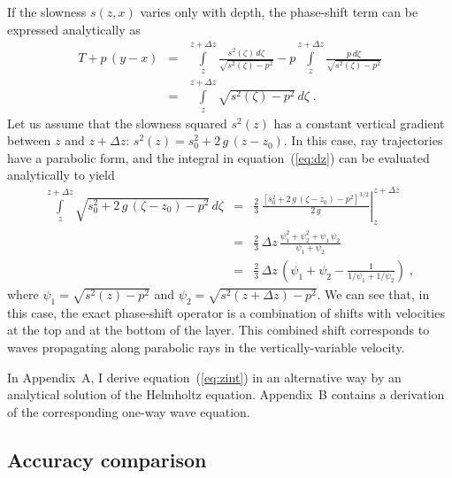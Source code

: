 If the slowness $s(z,x)$ varies only with depth, the phase-shift term can be
expressed analytically as
\begin{eqnarray}
\nonumber
  T + p\,(y-x) & = &
  \int\limits_{z}^{z+\Delta z} 
  \frac{s^2(\zeta)\,d \zeta}{\sqrt{s^2(\zeta)-p^2}}
  - p \int\limits_{z}^{z+\Delta z} \frac{p\,d \zeta}{\sqrt{s^2(\zeta)-p^2}} \\
  & = & \int\limits_{z}^{z+\Delta z} \sqrt{s^2(\zeta)-p^2}\,d \zeta\;.
  \label{eq:dz}
\end{eqnarray}
Let us assume that the slowness squared $s^2(z)$ has a constant vertical
gradient between $z$ and $z+\Delta z$: $s^2(z)=s_0^2+2\,g\,(z-z_0)$. In this
case, ray trajectories have a parabolic form, and the integral in
equation~(\ref{eq:dz}) can be evaluated analytically to yield
\begin{eqnarray}
\nonumber
  \int\limits_{z}^{z+\Delta z} \sqrt{s_0^2+2\,g\,(\zeta-z_0)-p^2}\,d \zeta 
  & = & \left.
  \frac{2}{3}\,\frac{\left[s_0^2+2\,g\,(\zeta-z_0)-p^2\right]^{3/2}}{2\,g}
  \right|_{z}^{z+\Delta z} \\
  \nonumber 
  & = &
  \frac{2}{3}\,\Delta z\,
  \frac{\psi_1^2+\psi_2^2+\psi_1\,\psi_2}{\psi_1+\psi_2} \\
  & = & 
  \frac{2}{3}\,\Delta z\,
  \left(\psi_1+\psi_2-\frac{1}{1/\psi_1+1/\psi_2}\right)\;,
  \label{eq:zint}
\end{eqnarray}
where $\psi_1 = \sqrt{s^2(z)-p^2}$ and $\psi_2 = \sqrt{s^2(z+\Delta z)-p^2}$.
We can see that, in this case, the exact phase-shift operator is a combination
of shifts with velocities at the top and at the bottom of the layer. This
combined shift corresponds to waves propagating along parabolic rays in the
vertically-variable velocity.

In Appendix~A, I derive equation~(\ref{eq:zint}) in an alternative way by an
analytical solution of the Helmholtz equation. Appendix~B contains a
derivation of the corresponding one-way wave equation.

\subsection{Accuracy comparison}



